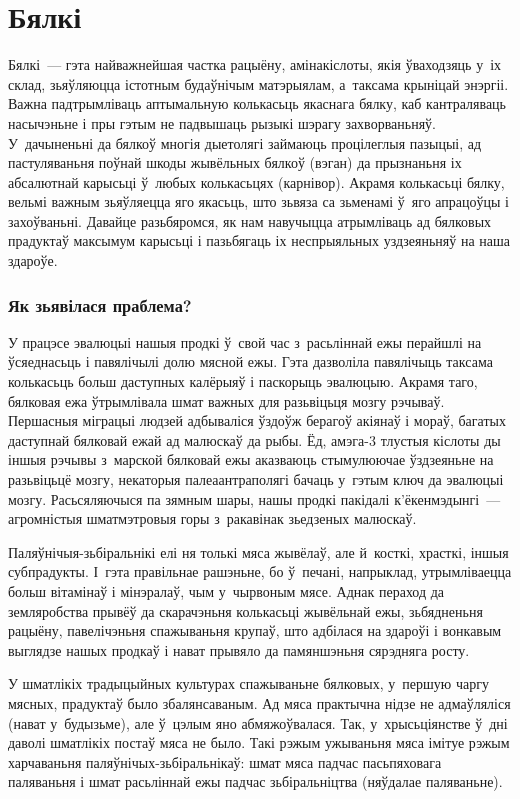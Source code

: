 \chapter{Бялкі}

Бялкі~--- гэта найважнейшая частка рацыёну, амінакіслоты, якія ўваходзяць у~іх склад, зьяўляюцца істотным будаўнічым матэрыялам, а~таксама крыніцай энэргіі. Важна падтрымліваць аптымальную колькасьць якаснага бялку, каб кантраляваць насычэньне і пры гэтым не падвышаць рызыкі шэрагу захворваньняў. У~дачыненьні да бялкоў многія дыетолягі займаюць процілеглыя пазыцыі, ад пастуляваньня поўнай шкоды жывёльных бялкоў (вэган) да прызнаньня іх абсалютнай карысьці ў~любых колькасьцях (карнівор). Акрамя колькасьці бялку, вельмі важным зьяўляецца яго якасьць, што зьвяза са зьменамі ў~яго апрацоўцы і захоўваньні. Давайце разьбяромся, як нам навучыцца атрымліваць ад бялковых прадуктаў максымум карысьці і пазьбягаць іх неспрыяльных уздзеяньняў на наша здароўе.

\subsection{Як зьявілася праблема?}

У працэсе эвалюцыі нашыя продкі ў~свой час з~расьліннай ежы перайшлі на ўсяеднасьць і павялічылі долю мясной ежы. Гэта дазволіла павялічыць таксама колькасьць больш даступных калёрыяў і паскорыць эвалюцыю. Акрамя таго, бялковая ежа ўтрымлівала шмат важных для разьвіцьця мозгу рэчываў. Першасныя міграцыі людзей адбываліся ўздоўж берагоў акіянаў і мораў, багатых даступнай бялковай ежай ад малюскаў да рыбы. Ёд, амэга-3 тлустыя кіслоты ды іншыя рэчывы з~марской бялковай ежы аказваюць стымулюючае ўздзеяньне на разьвіцьцё мозгу, некаторыя палеаантраполягі бачаць у~гэтым ключ да эвалюцыі мозгу. Расьсяляючыся па зямным шары, нашы продкі пакідалі к'ёкенмэдынгі~--- агромністыя шматмэтровыя горы з~ракавінак зьедзеных малюскаў.

Паляўнічыя-зьбіральнікі елі ня толькі мяса жывёлаў, але й~косткі, храсткі, іншыя субпрадукты. І~гэта правільнае рашэньне, бо ў~печані, напрыклад, утрымліваецца больш вітамінаў і мінэралаў, чым у~чырвоным мясе. Аднак пераход да земляробства прывёў да скарачэньня колькасьці жывёльнай ежы, зьбядненьня рацыёну, павелічэньня спажываньня крупаў, што адбілася на здароўі і вонкавым выглядзе нашых продкаў і нават прывяло да памяншэньня сярэдняга росту.

У шматлікіх традыцыйных культурах спажываньне бялковых, у~першую чаргу мясных, прадуктаў было збалянсаваным. Ад мяса практычна нідзе не адмаўляліся (нават у~будызьме), але ў~цэлым яно абмяжоўвалася. Так, у~хрысьціянстве ў~дні даволі шматлікіх постаў мяса не было. Такі рэжым ужываньня мяса імітуе рэжым харчаваньня паляўнічых-зьбіральнікаў: шмат мяса падчас пасьпяховага паляваньня і шмат расьліннай ежы падчас зьбіральніцтва (няўдалае паляваньне).

